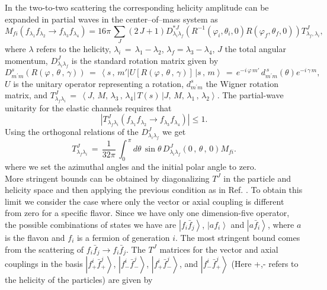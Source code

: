 \documentclass[prd,amsfonts,onecolumn,superscriptaddress,aps,nofootinbib,11pt]{revtex4-1}
\begin{document}
In the two-to-two scattering the corresponding helicity amplitude can be expanded in partial waves in the center–of–mass system as \cite{JACOB2000774} 
\begin{equation}
 M_{fi}\left(f_{\lambda_1} f_{\lambda_2} \rightarrow f_{\lambda_3} f_{\lambda_4}\right) = 16\pi\, \sum_{J} (2\,J+1)D^{*J}_{\lambda_i\lambda_f}(R^{-1}(\varphi_i,\theta_i,0)R(\varphi_f,\theta_f,0))T^{J}_{\lambda_f,\lambda_i},
\end{equation}
where $\lambda$ refers to the helicity, $\lambda_i \,=\, \lambda_1 - \lambda_2$, $\lambda_f = \lambda_3 - \lambda_4$, $J$ the total angular momentum, $D^J_{\lambda_i \lambda_f}$ is the standard rotation matrix given by 
\begin{equation}
D^{s}_{m^{\prime}m}\left(R\left(\varphi\,,\,\theta\,,\,\gamma\right)\right) \,=\, \left\langle s\,,\,m'\right| U\left[R\left(\varphi\,,\,\theta\,,\,\gamma \right)\right] \,\left|s\,,\,m \right\rangle \,=\, e^{-i \,\varphi\, m'}\, d^{\,s}_{m^{\prime}m}\left(\theta\right)e^{-i\, \gamma\, m},
\end{equation}
$U$ is the unitary operator representing a rotation, $d^{s}_{m^{\prime}m}$ the Wigner rotation matrix, and $T^J_{\lambda_f\lambda_i} \,=\, \left\langle J,\,M,\,\lambda_3\,,\,\lambda_4|\,T(s)\,| J,\,M,\,\lambda_1\,,\,\lambda_2\right\rangle$. The partial-wave unitarity for the elastic channels requires that
\begin{equation}
\left|T^{J}_{\lambda_f \lambda_i}\left(f_{\lambda_1} f_{\lambda_2} \rightarrow f_{\lambda_3} f_{\lambda_4}\right) \right| \leq 1.  
\end{equation}
\indent Using the orthogonal relations of the $D^{J}_{\lambda_i \lambda_f}$ we get
\begin{equation}
T^J_{\lambda_f\lambda_i} \,=\, \frac{1}{32\pi}\, \int_{0}^{\,\pi} d\theta\, \sin\theta\, D^J_{\lambda_i\lambda_f}\left(0\,,\,\theta\,,\,0\right) M_{fi}.
\end{equation}
where we set the azimuthal angles and the initial polar angle to zero. \\
\indent More stringent bounds can be obtained by diagonalizing $T^J$ in the particle and helicity space and then applying the previous condition as in Ref. \cite{Lee}. To obtain this limit we consider the case where only the vector or axial coupling is different from zero for a specific flavor.
Since we have only one dimension-five operator, the possible combinations of states we have are 
$\left|f_i \bar{f}_j\right\rangle$, $\left|a f_i\right\rangle$ and $\left|a \bar{f}_i\right\rangle$, where $a$ is the flavon and $f_i$ is a fermion of generation $i$. The most stringent bound comes from the scattering of $f_i \bar{f}_j \rightarrow f_i \bar{f}_j$. The $T^J$ matrices for the vector and axial couplings in the basis $\left|f^i_+ \bar{f}^j_+\right\rangle$, $\left|f^i_- \bar{f}^j_-\right\rangle$, $\left|f^i_+ \bar{f}^j_-\right\rangle$, and $\left|f^i_- \bar{f}^j_+\right\rangle$ (Here +,- refers to the helicity of the particles) are given by
\end{document}
